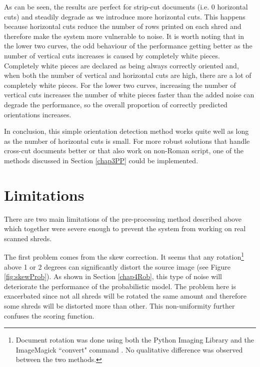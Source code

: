 As can be seen, the results are perfect for strip-cut documents (i.e. 0 horizontal cuts) and steadily degrade as we introduce more horizontal cuts. This happens because horizontal cuts reduce the number of rows printed on each shred and therefore make the system more vulnerable to noise. It is worth noting that in the lower two curves, the odd behaviour of the performance getting better as the number of vertical cuts increases is caused by completely white pieces. Completely white pieces are declared as being always correctly oriented and, when both the number of vertical and horizontal cuts are high, there are a lot of completely white pieces. For the lower two curves, increasing the number of vertical cuts increases the number of white pieces faster than the added noise can degrade the performance, so the overall proportion of correctly predicted orientations increases.

In conclusion, this simple orientation detection method works quite well as long as the number of horizontal cuts is small. For more robust solutions that handle cross-cut documents better or that also work on non-Roman script, one of the methods discussed in Section \ref{chap3PP} could be implemented.

\section{Limitations}

There are two main limitations of the pre-processing method described above which together were severe enough to prevent the system from working on real scanned shreds.

The first problem comes from the skew correction. It seems that any rotation\footnote{Document rotation was done using both the Python Imaging Library \cite{P52} and the ImageMagick ``convert" command \cite{P53}. No qualitative difference was observed between the two methods.} above 1 or 2 degrees can significantly distort the source image (see Figure \ref{fig:skewProb}). As shown in Section \ref{chap4Rob}, this type of noise will deteriorate the performance of the probabilistic model. The problem here is exacerbated since not all shreds will be rotated the same amount and therefore some shreds will be distorted more than other. This non-uniformity further confuses the scoring function.

